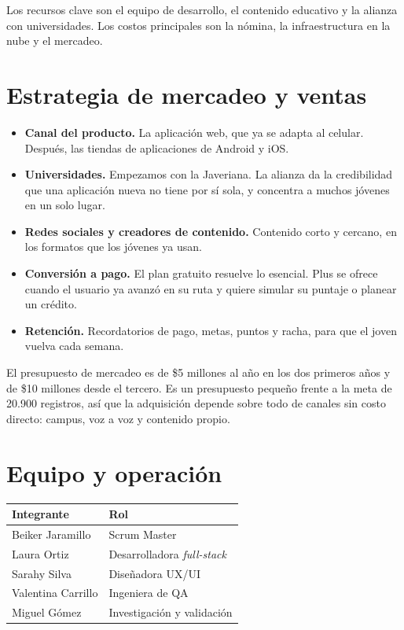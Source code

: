 \documentclass[11pt,a4paper]{article}
\begin{document}
Los recursos clave son el equipo de desarrollo, el contenido educativo y la alianza con universidades. Los costos principales son la nómina, la infraestructura en la nube y el mercadeo.

\section{Estrategia de mercadeo y ventas}

\begin{itemize}[leftmargin=1.5em]
  \item \textbf{Canal del producto.} La aplicación web, que ya se adapta al celular. Después, las tiendas de aplicaciones de Android y iOS.
  \item \textbf{Universidades.} Empezamos con la Javeriana. La alianza da la credibilidad que una aplicación nueva no tiene por sí sola, y concentra a muchos jóvenes en un solo lugar.
  \item \textbf{Redes sociales y creadores de contenido.} Contenido corto y cercano, en los formatos que los jóvenes ya usan.
  \item \textbf{Conversión a pago.} El plan gratuito resuelve lo esencial. Plus se ofrece cuando el usuario ya avanzó en su ruta y quiere simular su puntaje o planear un crédito.
  \item \textbf{Retención.} Recordatorios de pago, metas, puntos y racha, para que el joven vuelva cada semana.
\end{itemize}

El presupuesto de mercadeo es de \$5 millones al año en los dos primeros años y de \$10 millones desde el tercero. Es un presupuesto pequeño frente a la meta de 20.900 registros, así que la adquisición depende sobre todo de canales sin costo directo: campus, voz a voz y contenido propio.

\section{Equipo y operación}

\begin{tabularx}{\textwidth}{l X}
  \toprule
  \textbf{Integrante} & \textbf{Rol} \\
  \midrule
  Beiker Jaramillo & Scrum Master \\
  Laura Ortiz & Desarrolladora \textit{full-stack} \\
  Sarahy Silva & Diseñadora UX/UI \\
  Valentina Carrillo & Ingeniera de QA \\
  Miguel Gómez & Investigación y validación \\
  \bottomrule
\end{tabularx}
\end{document}

